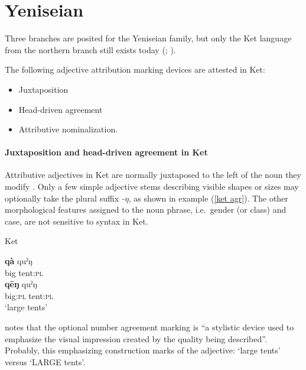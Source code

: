 \section{Yeniseian}\label{yeniseian synchr}
Three branches are posited for the Yeniseian family, but only the Ket language from the northern branch still exists today (\citealt{werner1997a}; \citealt[223]{salminen2007}).

The following adjective attribution marking devices are attested in Ket:
\begin{itemize}
\item Juxtaposition
\item Head\hyp{}driven agreement
\item Attributive nominalization.
\end{itemize}

\paragraph*{Juxtaposition and head\hyp{}driven agreement in Ket}
Attributive adjectives in Ket are normally juxtaposed to the left of the noun they modify \cite[38]{vajda2004}. Only a few simple adjective stems describing visible shapes or sizes may optionally take the plural suffix \textit{-ŋ}, as shown in example (\ref{ket agr}). The other morphological features assigned to the noun phrase, i.e.~gender (or class) and case, are not sensitive to syntax in Ket.
\begin{exe}
\ex 
\label{ket agr}
\rm{Ket \citep[38]{vajda2004}} 
\begin{xlist}
\ex	
\gll	\textbf{qà} quˀŋ\\
	big tent:\textsc{pl}\\
\ex	
\gll	\textbf{qēŋ} quˀŋ\\
	big:\textsc{pl} tent:\textsc{pl}\\
\glt	‘large tents’
\end{xlist}
\end{exe}
\citet[38]{vajda2004} notes that the optional number agreement marking is “a stylistic device used to emphasize the visual impression created by the quality being described”. Probably, this emphasizing construction marks  of the adjective: ‘large tents’ versus ‘LARGE tents’.


